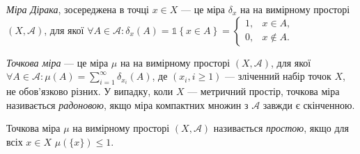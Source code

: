 \begin{definition}
    \emph{Міра Дірака}, зосереджена
    в точці $x \in X$ --- це міра $\delta_x$ на 
    на вимірному просторі $\left(X, \mathcal{A}\right)$,
    для якої $\forall A \in \mathcal{A}: \delta_x(A) = \mathds{1}\left\{x \in A\right\} = 
    \begin{cases}
        1, & x \in A, \\
        0, & x \notin A.
    \end{cases}$
\end{definition}
\begin{definition}
    \emph{Точкова міра} --- це міра $\mu$ на 
    на вимірному просторі $\left(X, \mathcal{A}\right)$,
    для якої $\forall A \in \mathcal{A}: \mu(A) = \sum_{i=1}^{\infty} \delta_{x_i}(A)$,
    де $\left(x_i, i \geq 1\right)$ --- зліченний набір точок $X$, не обов'язково різних.
    У випадку, коли $X$ --- метричний простір, точкова міра називається \emph{радоновою},
    якщо міра компактних множин з $\mathcal{A}$ завжди є скінченною.
\end{definition}
\begin{definition}
    Точкова міра $\mu$ на вимірному просторі $\left(X, \mathcal{A}\right)$ називається \emph{простою},
    якщо для всіх $x \in X$ $\mu\left(\{x\}\right) \leq 1$.
\end{definition}

